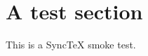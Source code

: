 \documentclass{article}
\begin{document}
\section{A test section}
\label{sec:intro}
This is a SyncTeX smoke test.



\end{document}
